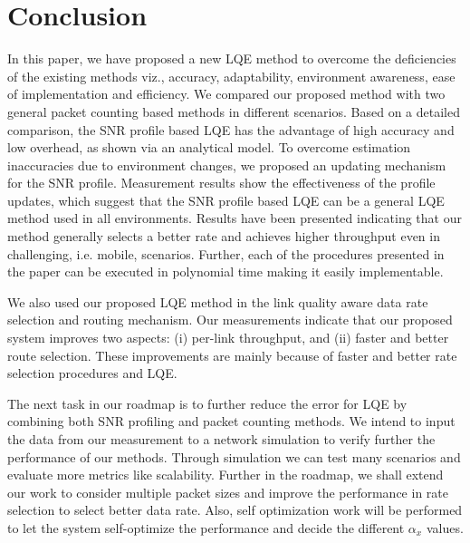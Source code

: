 \documentclass[11pt,draftclsnofoot,journal,onecolumn]{IEEEtran}
\begin{document}
\section{Conclusion}
\label{sec:Conclusion}

In this paper, we have proposed a new LQE method to overcome the deficiencies of the existing methods viz., accuracy, adaptability, environment awareness, ease of implementation and efficiency. We compared our proposed method with two general packet counting based methods in different scenarios. Based on a detailed comparison, the SNR profile based LQE has the advantage of high accuracy and low overhead, as shown via an analytical model. To overcome estimation inaccuracies due to environment changes, we proposed an updating mechanism for the SNR profile. Measurement results show the effectiveness of the profile updates, which suggest that the SNR profile based LQE can be a general LQE method used in all environments. Results have been presented indicating that our method generally selects a better rate and achieves higher throughput even in challenging, i.e. mobile, scenarios. Further, each of the procedures presented in the paper can be executed in polynomial time making it easily implementable.

We also used our proposed LQE method in the link quality aware data rate selection and routing mechanism. Our measurements indicate that our proposed system improves two aspects: (i) per-link throughput, and (ii) faster and better route selection. These improvements are mainly because of faster and better rate selection procedures and LQE.

The next task in our roadmap is to further reduce the error for LQE by combining both SNR profiling and packet counting methods. We intend to input the data from our measurement to a network simulation to verify further the performance of our methods. Through simulation we can test many scenarios and evaluate more metrics like scalability. Further in the roadmap, we shall extend our work to consider multiple packet sizes and improve the performance in rate selection to select better data rate. Also, self optimization work will be performed to let the system self-optimize the performance and decide the different $\alpha_x$ values.
\end{document}
